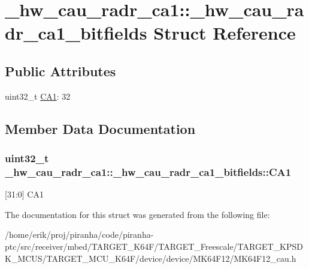 \hypertarget{struct__hw__cau__radr__ca1_1_1__hw__cau__radr__ca1__bitfields}{}\section{\+\_\+hw\+\_\+cau\+\_\+radr\+\_\+ca1\+:\+:\+\_\+hw\+\_\+cau\+\_\+radr\+\_\+ca1\+\_\+bitfields Struct Reference}
\label{struct__hw__cau__radr__ca1_1_1__hw__cau__radr__ca1__bitfields}
\subsection*{Public Attributes}
\begin{DoxyCompactItemize}
\item 
uint32\+\_\+t \hyperlink{struct__hw__cau__radr__ca1_1_1__hw__cau__radr__ca1__bitfields_a34e0f5524269be786e521d9dc7296c09}{C\+A1}\+: 32
\end{DoxyCompactItemize}


\subsection{Member Data Documentation}
\subsubsection[{\texorpdfstring{C\+A1}{CA1}}]{\setlength{\rightskip}{0pt plus 5cm}uint32\+\_\+t \+\_\+hw\+\_\+cau\+\_\+radr\+\_\+ca1\+::\+\_\+hw\+\_\+cau\+\_\+radr\+\_\+ca1\+\_\+bitfields\+::\+C\+A1}\hypertarget{struct__hw__cau__radr__ca1_1_1__hw__cau__radr__ca1__bitfields_a34e0f5524269be786e521d9dc7296c09}{}\label{struct__hw__cau__radr__ca1_1_1__hw__cau__radr__ca1__bitfields_a34e0f5524269be786e521d9dc7296c09}
\mbox{[}31\+:0\mbox{]} C\+A1 

The documentation for this struct was generated from the following file\+:\begin{DoxyCompactItemize}
\item 
/home/erik/proj/piranha/code/piranha-\/ptc/src/receiver/mbed/\+T\+A\+R\+G\+E\+T\+\_\+\+K64\+F/\+T\+A\+R\+G\+E\+T\+\_\+\+Freescale/\+T\+A\+R\+G\+E\+T\+\_\+\+K\+P\+S\+D\+K\+\_\+\+M\+C\+U\+S/\+T\+A\+R\+G\+E\+T\+\_\+\+M\+C\+U\+\_\+\+K64\+F/device/device/\+M\+K64\+F12/M\+K64\+F12\+\_\+cau.\+h\end{DoxyCompactItemize}
